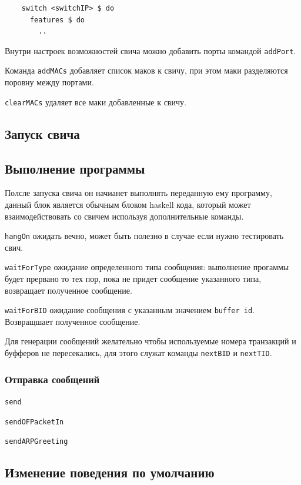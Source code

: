 \documentclass[9pt,a4paper]{article}
\begin{document}
\begin{lstlisting}
    switch <switchIP> $ do
      features $ do
        ..
\end{lstlisting}

Внутри настроек возможностей свича можно добавить порты командой \lstinline!addPort!.

Команда \lstinline!addMACs! добавляет список маков к свичу, при этом маки разделяются
поровну между портами.

\lstinline!clearMACs! удаляет все маки добавленные к свичу.


\subsection{Запуск свича}
\subsection{Выполнение программы}
Полсле запуска  свича он начианет выполнять переданную ему программу, данный блок 
является обычным блоком haskell кода, который может взаимодействовать со свичем
используя дополнительные команды.

\lstinline!hangOn! ожидать вечно, может быть полезно в случае если нужно тестировать
свич.

\lstinline!waitForType! ожидание определенного типа сообщения: выполнение прогаммы
будет прервано то тех пор, пока не придет сообщение указанного типа, возвращает 
полученное сообщение.

\lstinline!waitForBID! ожидание сообщения с указанным значением \texttt{buffer id}.
Возвращшает полученное сообщение.

Для генерации сообщений желательно чтобы используемые номера транзакций и буфферов 
не пересекались, для этого служат команды \lstinline!nextBID! и \lstinline!nextTID!.

\subsubsection{Отправка сообщений}

\lstinline!send!

\lstinline!sendOFPacketIn!

\lstinline!sendARPGreeting!

\subsection{Изменение поведения по умолчанию}
\end{document}
